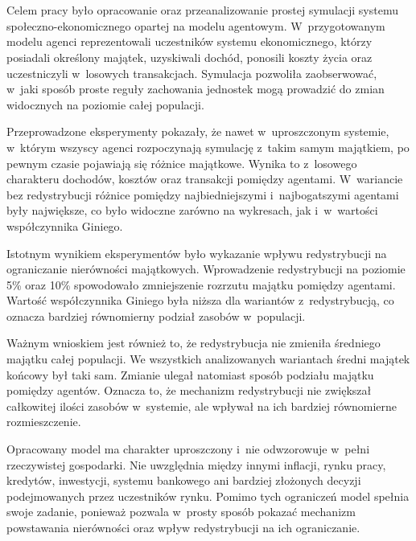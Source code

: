 \documentclass[polish]{projectreport}
\begin{document}
\section{\SectionTitleSummary}
\label{sec:conclusions}
 
Celem pracy by\l{}o opracowanie oraz przeanalizowanie prostej symulacji systemu
spo\l{}eczno-\allowbreak ekonomicznego opartej na modelu agentowym. W~przygotowanym modelu agenci
reprezentowali uczestnik\'ow systemu ekonomicznego, kt\'orzy posiadali okre\'slony
maj\k{a}tek, uzyskiwali doch\'od, ponosili koszty \.{z}ycia oraz uczestniczyli w~losowych
transakcjach. Symulacja pozwoli\l{}a zaobserwowa\'{c}, w~jaki spos\'ob proste regu\l{}y zachowania
jednostek mog\k{a} prowadzi\'{c} do zmian widocznych na poziomie ca\l{}ej populacji.
 
Przeprowadzone eksperymenty pokaza\l{}y, \.{z}e nawet w~uproszczonym systemie, w~kt\'orym
wszyscy agenci rozpoczynaj\k{a} symulacj\k{e} z~takim samym maj\k{a}tkiem, po pewnym czasie
pojawiaj\k{a} si\k{e} r\'o\.{z}nice maj\k{a}tkowe. Wynika to z~losowego charakteru dochod\'ow, koszt\'ow
oraz transakcji pomi\k{e}dzy agentami. W~wariancie bez redystrybucji r\'o\.{z}nice pomi\k{e}dzy
najbiedniejszymi i~najbogatszymi agentami by\l{}y najwi\k{e}ksze, co by\l{}o widoczne zar\'owno
na wykresach, jak i~w~warto\'sci wsp\'o\l{}czynnika Giniego.
 
Istotnym wynikiem eksperyment\'ow by\l{}o wykazanie wp\l{}ywu redystrybucji na ograniczanie
nier\'owno\'sci maj\k{a}tkowych. Wprowadzenie redystrybucji na poziomie 5\% oraz 10\%
spowodowa\l{}o zmniejszenie rozrzutu maj\k{a}tku pomi\k{e}dzy agentami. Warto\'s\'{c} wsp\'o\l{}czynnika
Giniego by\l{}a ni\.{z}sza dla wariant\'ow z~redystrybucj\k{a}, co oznacza bardziej r\'ownomierny
podzia\l{} zasob\'ow w~populacji.
 
Wa\.{z}nym wnioskiem jest r\'ownie\.{z} to, \.{z}e redystrybucja nie zmieni\l{}a \'sredniego maj\k{a}tku
ca\l{}ej populacji. We wszystkich analizowanych wariantach \'sredni maj\k{a}tek ko\'ncowy by\l{}
taki sam. Zmianie ulega\l{} natomiast spos\'ob podzia\l{}u maj\k{a}tku pomi\k{e}dzy agent\'ow. Oznacza
to, \.{z}e mechanizm redystrybucji nie zwi\k{e}ksza\l{} ca\l{}kowitej ilo\'sci zasob\'ow w~systemie,
ale wp\l{}ywa\l{} na ich bardziej r\'ownomierne rozmieszczenie.
 
Opracowany model ma charakter uproszczony i~nie odwzorowuje w~pe\l{}ni rzeczywistej
gospodarki. Nie uwzgl\k{e}dnia mi\k{e}dzy innymi inflacji, rynku pracy, kredyt\'ow, inwestycji,
systemu bankowego ani bardziej z\l{}o\.{z}onych decyzji podejmowanych przez uczestnik\'ow
rynku. Pomimo tych ogranicze\'n model spe\l{}nia swoje zadanie, poniewa\.{z} pozwala
w~prosty spos\'ob pokaza\'{c} mechanizm powstawania nier\'owno\'sci oraz wp\l{}yw redystrybucji
na ich ograniczanie.
 
\end{document}
